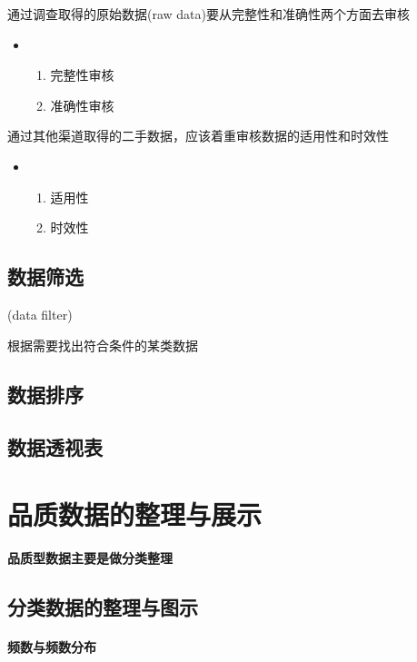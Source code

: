 \documentclass[UTF8,10pt]{book}
\begin{document}
        通过调查取得的原始数据(raw data)要从完整性和准确性两个方面去审核

        \begin{itemize}
            \item [] {
                \begin{enumerate}
                    \item 完整性审核
                    \item 准确性审核
                \end{enumerate}
            }
        \end{itemize}

        通过其他渠道取得的二手数据，应该着重审核数据的适用性和时效性
        \begin{itemize}
            \item [] {
                \begin{enumerate}
                    \item 适用性
                    \item 时效性
                \end{enumerate}
            }
        \end{itemize}

        
    \subsection{数据筛选}
        (data filter)

        根据需要找出符合条件的某类数据

    \subsection{数据排序}
    \subsection{数据透视表}



    \section{品质数据的整理与展示}
        \textbf{品质型数据主要是做分类整理}

    \subsection{分类数据的整理与图示}
        \paragraph{频数与频数分布} 
\end{document}
